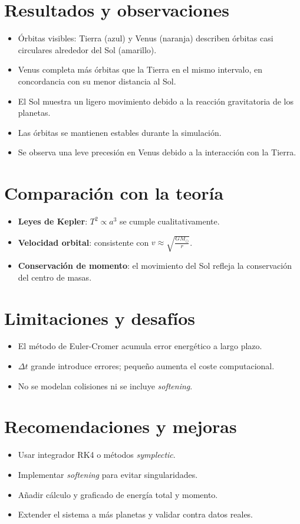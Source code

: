 \documentclass[12pt,a4paper]{article}
\begin{document}
\section{Resultados y observaciones}
\begin{itemize}
    \item Órbitas visibles: Tierra (azul) y Venus (naranja) describen órbitas casi circulares alrededor del Sol (amarillo).
    \item Venus completa más órbitas que la Tierra en el mismo intervalo, en concordancia con su menor distancia al Sol.
    \item El Sol muestra un ligero movimiento debido a la reacción gravitatoria de los planetas.
    \item Las órbitas se mantienen estables durante la simulación.
    \item Se observa una leve precesión en Venus debido a la interacción con la Tierra.
\end{itemize}

\section{Comparación con la teoría}
\begin{itemize}
    \item \textbf{Leyes de Kepler}: $T^2 \propto a^3$ se cumple cualitativamente.
    \item \textbf{Velocidad orbital}: consistente con $v \approx \sqrt{\frac{GM_{\odot}}{r}}$.
    \item \textbf{Conservación de momento}: el movimiento del Sol refleja la conservación del centro de masas.
\end{itemize}

\section{Limitaciones y desafíos}
\begin{itemize}
    \item El método de Euler-Cromer acumula error energético a largo plazo.
    \item $\Delta t$ grande introduce errores; pequeño aumenta el coste computacional.
    \item No se modelan colisiones ni se incluye \emph{softening}.
\end{itemize}

\section{Recomendaciones y mejoras}
\begin{itemize}
    \item Usar integrador RK4 o métodos \emph{symplectic}.
    \item Implementar \emph{softening} para evitar singularidades.
    \item Añadir cálculo y graficado de energía total y momento.
    \item Extender el sistema a más planetas y validar contra datos reales.
\end{itemize}
\end{document}
